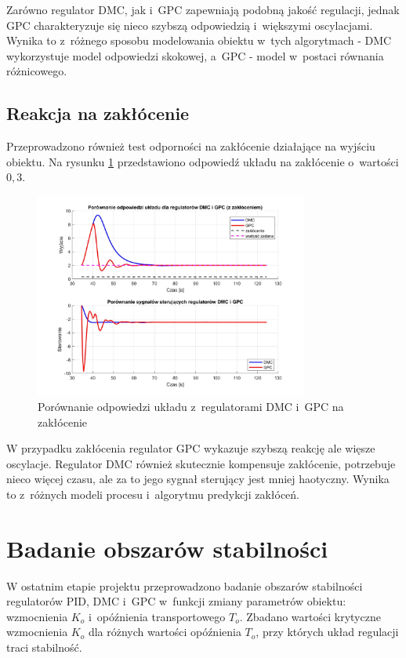 \documentclass[a4paper,titlepage,11pt,floatssmall]{mwrep}
\begin{document}
Zarówno regulator DMC, jak i~GPC zapewniają podobną jakość regulacji, jednak GPC charakteryzuje się nieco szybszą odpowiedzią i~większymi oscylacjami. Wynika to z~różnego sposobu modelowania obiektu w~tych algorytmach - DMC wykorzystuje model odpowiedzi skokowej, a~GPC - model w~postaci równania różnicowego.

\subsection{Reakcja na zakłócenie}

Przeprowadzono również test odporności na zakłócenie działające na wyjściu obiektu. Na rysunku \ref{fig:dmc_gpc_disturbance} przedstawiono odpowiedź układu na zakłócenie o~wartości $0,3$.

\begin{figure}[H]
    \centering
    \includegraphics[width=0.8\textwidth]{kod/wykresy/DMC_vs_GPC_disturbance.jpg}
    \caption{Porównanie odpowiedzi układu z~regulatorami DMC i~GPC na zakłócenie}
    \label{fig:dmc_gpc_disturbance}
\end{figure}

W przypadku zakłócenia regulator GPC wykazuje szybszą reakcję ale więsze oscylacje. Regulator DMC również skutecznie kompensuje zakłócenie, potrzebuje nieco więcej czasu, ale za to jego sygnał sterujący jest mniej haotyczny. Wynika to z~różnych modeli procesu i~algorytmu predykcji zakłóceń.

\section{Badanie obszarów stabilności}

W ostatnim etapie projektu przeprowadzono badanie obszarów stabilności regulatorów PID, DMC i~GPC w~funkcji zmiany parametrów obiektu: wzmocnienia $K_o$ i~opóźnienia transportowego $T_o$. Zbadano wartości krytyczne wzmocnienia $K_o$ dla różnych wartości opóźnienia $T_o$, przy których układ regulacji traci stabilność.
\end{document}
